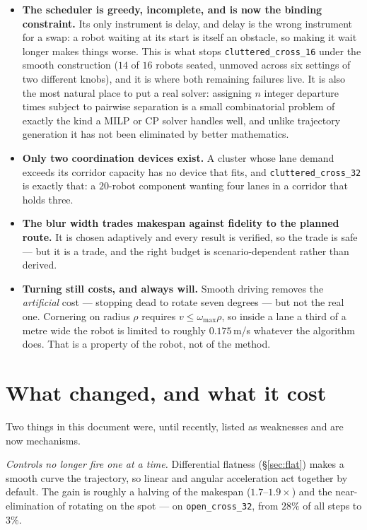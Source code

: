 \documentclass[11pt,a4paper]{article}
\begin{document}
\begin{itemize}
\item \textbf{The scheduler is greedy, incomplete, and is now the binding constraint.}
Its only instrument is delay, and delay is the wrong instrument for a swap: a robot waiting
at its start is itself an obstacle, so making it wait longer makes things worse. This is
what stops \texttt{cluttered\_cross\_16} under the smooth construction ($14$ of $16$ robots
seated, unmoved across six settings of two different knobs), and it is where both remaining
failures live. It is also the most natural place to put a real solver: assigning $n$ integer
departure times subject to pairwise separation is a small combinatorial problem of exactly
the kind a MILP or CP solver handles well, and unlike trajectory generation it has not been
eliminated by better mathematics.

\item \textbf{Only two coordination devices exist.} A cluster whose lane demand exceeds its
corridor capacity has no device that fits, and \texttt{cluttered\_cross\_32} is exactly
that: a $20$-robot component wanting four lanes in a corridor that holds three.

\item \textbf{The blur width trades makespan against fidelity to the planned route.} It is
chosen adaptively and every result is verified, so the trade is safe --- but it is a trade,
and the right budget is scenario-dependent rather than derived.

\item \textbf{Turning still costs, and always will.} Smooth driving removes the
\emph{artificial} cost --- stopping dead to rotate seven degrees --- but not the real one.
Cornering on radius $\rho$ requires $v \le \omega_{\max}\rho$, so inside a lane a third of a
metre wide the robot is limited to roughly $0.175$\,m/s whatever the algorithm does. That is
a property of the robot, not of the method.
\end{itemize}

\section*{What changed, and what it cost}

Two things in this document were, until recently, listed as weaknesses and are now
mechanisms.

\emph{Controls no longer fire one at a time.} Differential flatness
(\S\ref{sec:flat}) makes a smooth curve the trajectory, so linear and angular acceleration
act together by default. The gain is roughly a halving of the makespan
($1.7$--$1.9\times$) and the near-elimination of rotating on the spot --- on
\texttt{open\_cross\_32}, from $28\%$ of all steps to $3\%$.
\end{document}
